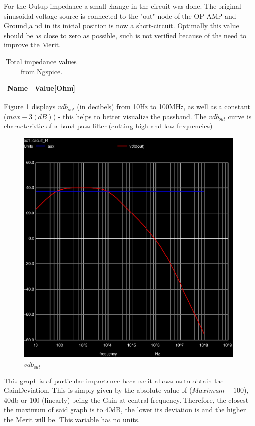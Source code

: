 For the Outup impedance a small change in the circuit was done. The original sinusoidal voltage source is connected to the "out" node of the OP-AMP and Ground,a nd in its inicial position is now a short-circuit. Optimally this value should be as close to zero as possible, such is not verified because of the need to improve the Merit. 

\begin{table}[ht]
	\centering
	\begin{tabular}{|l|r|}
		\hline    
		{\bf Name} & {\bf Value[Ohm]} \\ \hline
    		
    		
	\end{tabular}
	
	\caption{Total impedance values from Ngspice.}
    
\label{tab:imp_sim}
\end{table}

Figure \ref{fig:Vout} displays $vdb_{out}$ (in decibels) from 10Hz to 100MHz, as well as a constant ($max-3(dB)$) - this helps to better visualize the passband. The $vdb_{out}$ curve is characteristic of a band pass filter (cutting high and low frequencies).

\begin{figure}[ht]
	\centering
	\includegraphics[width=0.6\linewidth]{acvout.eps}
	\caption{$vdb_{out}$}
\label{fig:Vout}
\end{figure}

This graph is of particular importance because it allows us to obtain the GainDeviation. This is simply given by the absolute value of ($Maximum - 100$), 40db or 100 (linearly) being the Gain at central frequency. Therefore, the closest the maximum of said graph is to 40dB, the lower its deviation is and the higher the Merit will be. This variable has no units.

